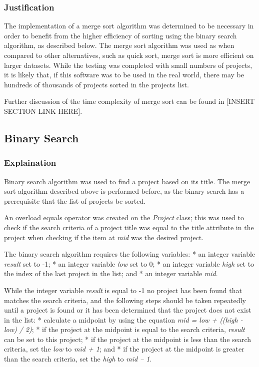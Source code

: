 \documentclass[
  english,
  a4paper,
,tablecaptionabove
]{scrartcl}
\begin{document}
\hypertarget{justification}{%
\subsubsection{Justification}\label{justification}}

The implementation of a merge sort algorithm was determined to be
necessary in order to benefit from the higher efficiency of sorting
using the binary search algorithm, as described below. The merge sort
algorithm was used as when compared to other alternatives, such as quick
sort, merge sort is more efficient on larger datasets. While the testing
was completed with small numbers of projects, it is likely that, if this
software was to be used in the real world, there may be hundreds of
thousands of projects sorted in the projects list.

Further discussion of the time complexity of merge sort can be found in
{[}INSERT SECTION LINK HERE{]}.

\hypertarget{binary-search}{%
\subsection{Binary Search}\label{binary-search}}

\hypertarget{explaination-1}{%
\subsubsection{Explaination}\label{explaination-1}}

Binary search algorithm was used to find a project based on its title.
The merge sort algorithm described above is performed before, as the
binary search has a prerequisite that the list of projects be sorted.

An overload equals operator was created on the \emph{Project} class;
this was used to check if the search criteria of a project title was
equal to the title attribute in the project when checking if the item at
\emph{mid} was the desired project.

The binary search algorithm requires the following variables: * an
integer variable \emph{result} set to -1; * an integer variable
\emph{low} set to 0; * an integer variable \emph{high} set to the index
of the last project in the list; and * an integer variable \emph{mid}.

While the integer variable \emph{result} is equal to -1 no project has
been found that matches the search criteria, and the following steps
should be taken repeatedly until a project is found or it has been
determined that the project does not exist in the list: * calculate a
midpoint by using the equation \emph{mid = low + ((high - low) / 2)}; *
if the project at the midpoint is equal to the search criteria,
\emph{result} can be set to this project; * if the project at the
midpoint is less than the search criteria, set the \emph{low} to
\emph{mid + 1}; and * if the project at the midpoint is greater than the
search criteria, set the \emph{high} to \emph{mid -- 1}.
\end{document}
